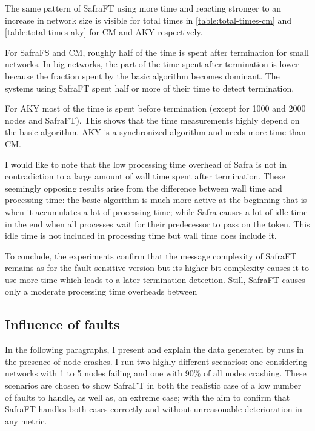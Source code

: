 The same pattern of SafraFT using more time and reacting stronger to an increase in network size is visible for total times in \cref{table:total-times-cm} and \cref{table:total-times-aky} for CM and AKY respectively.

For SafraFS and CM, roughly half of the time is spent after termination for small networks.
In big networks, the part of the time spent after termination is lower because the fraction spent by the basic algorithm becomes dominant.
The systems using SafraFT spent half or more of their time to detect termination.

For AKY most of the time is spent before termination (except for 1000 and 2000 nodes and SafraFT).
This shows that the time measurements highly depend on the basic algorithm.
AKY is a synchronized algorithm and needs more time than CM.

I would like to note that the low processing time overhead of Safra is not in contradiction to a large amount of wall time spent after termination.
These seemingly opposing results arise from the difference between wall time and processing time: the basic algorithm is much more active at the beginning that is when it accumulates a lot of processing time; while Safra causes a lot of idle time in the end when all processes wait for their predecessor to pass on the token.
This idle time is not included in processing time but wall time does include it.

To conclude, the experiments confirm that the message complexity of SafraFT remains as for the fault sensitive version but its higher bit complexity causes it to use more time which leads to a later termination detection.
Still, SafraFT causes only a moderate processing time overheads between %

\subsection{Influence of faults}
In the following paragraphs, I present and explain the data generated by runs in the presence of node crashes.
I run two highly different scenarios: one considering networks with 1 to 5 nodes failing and one with 90\% of all nodes crashing.
These scenarios are chosen to show SafraFT in both the realistic case of a low number of faults to handle, as well as, an extreme case; with the aim to confirm that SafraFT handles both cases correctly and without unreasonable deterioration in any metric.

